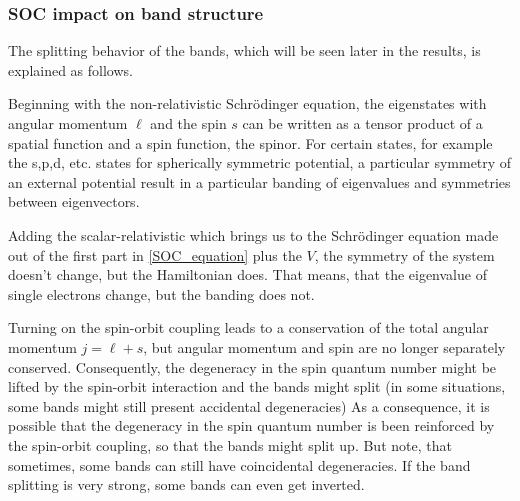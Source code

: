 \subsubsection{SOC impact on band structure}
	The splitting behavior of the bands, which will be seen later in the results, is explained as follows.
	
	Beginning with the non-relativistic Schrödinger equation, the eigenstates with angular momentum $\ell$ and the spin $s$ can be written as a tensor product of a spatial function and a spin function, the spinor. For certain states, for example the s,p,d, etc. states for spherically symmetric potential, a particular symmetry of an external potential result in a particular banding of eigenvalues and symmetries between eigenvectors. 
	
	Adding the scalar-relativistic which brings us to the Schrödinger equation made out of the first part in \ref{SOC_equation} plus the $V$, the symmetry of the system doesn't change, but the Hamiltonian does. That means, that the eigenvalue of single electrons change, but the banding does not. 
	
	Turning on the spin-orbit coupling leads to a conservation of the total angular momentum $j=\ell + s$, but angular momentum and spin are no longer separately conserved. 
	Consequently, the degeneracy in the spin quantum number might be lifted by the spin-orbit interaction and the bands might split (in some situations, some bands might still present accidental degeneracies)
	As a consequence, it is possible that the degeneracy in the spin quantum number is been reinforced by the spin-orbit coupling, so that the bands might split up. But note, that sometimes, some bands can still have coincidental degeneracies. 
	If the band splitting is very strong, some bands can even get inverted.
	
	

